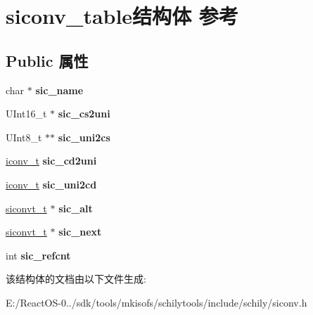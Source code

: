 \hypertarget{structsiconv__table}{}\section{siconv\+\_\+table结构体 参考}
\label{structsiconv__table}
\subsection*{Public 属性}
\begin{DoxyCompactItemize}
\item 
\mbox{\label{structsiconv__table_a0f48270193327da1fc1db5b29acd4ca1}} 
char $\ast$ {\bfseries sic\+\_\+name}
\item 
\mbox{\label{structsiconv__table_a8b648876d67d0a47c05b9e2d6fd92c63}} 
U\+Int16\+\_\+t $\ast$ {\bfseries sic\+\_\+cs2uni}
\item 
\mbox{\label{structsiconv__table_a3ea23b62bbccc92730179b8e5001356e}} 
U\+Int8\+\_\+t $\ast$$\ast$ {\bfseries sic\+\_\+uni2cs}
\item 
\mbox{\label{structsiconv__table_a0600addb4632ea89c8fce97d8a6ec24c}} 
\hyperlink{interfacevoid}{iconv\+\_\+t} {\bfseries sic\+\_\+cd2uni}
\item 
\mbox{\label{structsiconv__table_abe5ade597b1dec66a26bcad7161af9ee}} 
\hyperlink{interfacevoid}{iconv\+\_\+t} {\bfseries sic\+\_\+uni2cd}
\item 
\mbox{\label{structsiconv__table_a65b16712db8f819288cfde9b22ffab51}} 
\hyperlink{structsiconv__table}{siconvt\+\_\+t} $\ast$ {\bfseries sic\+\_\+alt}
\item 
\mbox{\label{structsiconv__table_a7b4f5a7f3762869e483f041cd7a26dc7}} 
\hyperlink{structsiconv__table}{siconvt\+\_\+t} $\ast$ {\bfseries sic\+\_\+next}
\item 
\mbox{\label{structsiconv__table_a9ea2e49efe5fff5581b08e08903725a3}} 
int {\bfseries sic\+\_\+refcnt}
\end{DoxyCompactItemize}


该结构体的文档由以下文件生成\+:\begin{DoxyCompactItemize}
\item 
E\+:/\+React\+O\+S-\/0../sdk/tools/mkisofs/schilytools/include/schily/siconv.\+h\end{DoxyCompactItemize}
